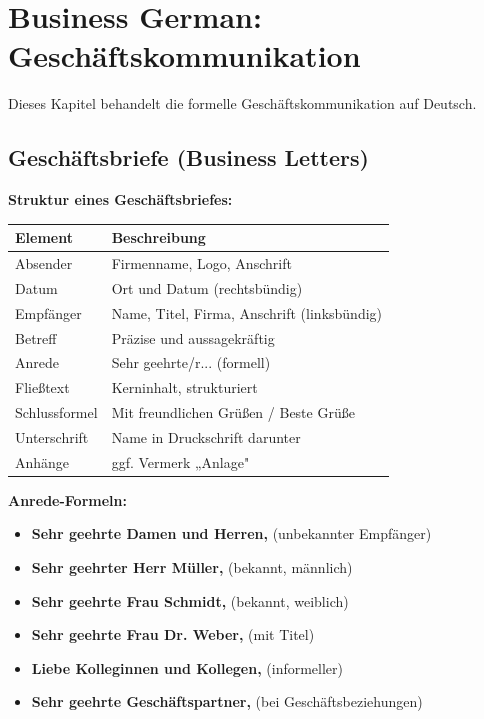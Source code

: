 \chapter{Business German: Geschäftskommunikation}
\label{cha:Business}

Dieses Kapitel behandelt die formelle Geschäftskommunikation auf Deutsch.

\section{Geschäftsbriefe (Business Letters)}
\label{sec:Geschaeftsbriefe}

\bigskip
\noindent\textbf{Struktur eines Geschäftsbriefes:}

\begin{center}
\begin{tabular}{|l|p{8cm}|}
\hline
Element & Beschreibung \\ \hline
Absender & Firmenname, Logo, Anschrift \\ \hline
Datum & Ort und Datum (rechtsbündig) \\ \hline
Empfänger & Name, Titel, Firma, Anschrift (linksbündig) \\ \hline
Betreff & Präzise und aussagekräftig \\ \hline
Anrede & Sehr geehrte/r... (formell) \\ \hline
Fließtext & Kerninhalt, strukturiert \\ \hline
Schlussformel & Mit freundlichen Grüßen / Beste Grüße \\ \hline
Unterschrift & Name in Druckschrift darunter \\ \hline
Anhänge & ggf. Vermerk „Anlage" \\ \hline
\end{tabular}
\end{center}

\bigskip
\noindent\textbf{Anrede-Formeln:}

\begin{itemize}
    \item \textbf{Sehr geehrte Damen und Herren,} (unbekannter Empfänger)
    \item \textbf{Sehr geehrter Herr Müller,} (bekannt, männlich)
    \item \textbf{Sehr geehrte Frau Schmidt,} (bekannt, weiblich)
    \item \textbf{Sehr geehrte Frau Dr. Weber,} (mit Titel)
    \item \textbf{Liebe Kolleginnen und Kollegen,} (informeller)
    \item \textbf{Sehr geehrte Geschäftspartner,} (bei Geschäftsbeziehungen)
\end{itemize}

